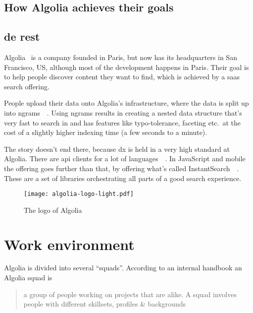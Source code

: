 
\subsection{How Algolia achieves their goals} 



\subsection{de rest} %

Algolia~\cite{algolia-home} is a company founded in Paris, but now has its headquarters in San Francisco, US, although most of the development happens in Paris. Their goal is to help people discover content they want to find, which is achieved by a \acrshort{saas} search offering.

People upload their data onto Algolia's infrastructure, where the data is split up into \glspl{ngram}~\cite{kimbrell1988searching}~. Using \glspl{ngram} results in creating a nested data structure that’s very fast to search in and has features like typo-tolerance, faceting etc.\ at  the cost of a slightly higher indexing time (a few seconds to a minute).\cite{paris-nlp-algolia}

The story doesn't end there, because \acrfull{dx} is held in a very high standard at Algolia. There are \acrshort{api} clients for a lot of languages~\cite{doc-api-clients}~. In JavaScript and mobile the offering goes further than that, by offering what’s called InstantSearch~\cite{instantsearch-js, react-instantsearch, instantsearch-android, instantsearch-ios}~. These are a set of libraries orchestrating all parts of a good search experience.

\begin{figure}[H]
  \centering
  \texttt{[image: algolia-logo-light.pdf]}
  \caption{The logo of Algolia~\cite{algolia-press}}
  \label{figure:company-logo}
\end{figure}

\section{Work environment}
\label{sec:work-environment}

Algolia is divided into several ``squads''. According to an internal handbook an Algolia squad is

\begin{quotation}
  a group of people working on projects that are alike. A squad involves people with different skillsets, profiles \& backgrounds
\end{quotation}

